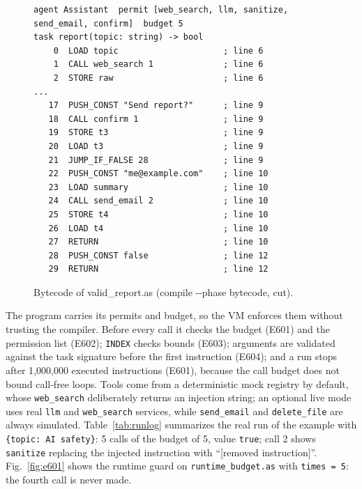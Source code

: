 \documentclass[conference]{IEEEtran}
\begin{document}
\begin{figure}[!htb]
\begin{lstlisting}
agent Assistant  permit [web_search, llm, sanitize, send_email, confirm]  budget 5
task report(topic: string) -> bool
    0  LOAD topic                     ; line 6
    1  CALL web_search 1              ; line 6
    2  STORE raw                      ; line 6
...
   17  PUSH_CONST "Send report?"      ; line 9
   18  CALL confirm 1                 ; line 9
   19  STORE t3                       ; line 9
   20  LOAD t3                        ; line 9
   21  JUMP_IF_FALSE 28               ; line 9
   22  PUSH_CONST "me@example.com"    ; line 10
   23  LOAD summary                   ; line 10
   24  CALL send_email 2              ; line 10
   25  STORE t4                       ; line 10
   26  LOAD t4                        ; line 10
   27  RETURN                         ; line 10
   28  PUSH_CONST false               ; line 12
   29  RETURN                         ; line 12
\end{lstlisting}
\caption{Bytecode of valid\_report.as (compile -{}-phase bytecode, cut).}
\label{fig:bytecode}
\end{figure}

The program carries its permits and budget, so the VM enforces them without trusting the compiler. Before every call it checks the budget (E601) and the permission list (E602); \texttt{INDEX} checks bounds (E603); arguments are validated against the task signature before the first instruction (E604); and a run stops after 1,000,000 executed instructions (E601), because the call budget does not bound call-free loops. Tools come from a deterministic mock registry by default, whose \texttt{web\_search} deliberately returns an injection string; an optional live mode uses real \texttt{llm} and \texttt{web\_search} services, while \texttt{send\_email} and \texttt{delete\_file} are always simulated. Table~\ref{tab:runlog} summarizes the real run of the example with \texttt{\{\textquotedbl{}topic\textquotedbl{}: \textquotedbl{}AI safety\textquotedbl{}\}}: 5 calls of the budget of 5, value \texttt{true}; call 2 shows \texttt{sanitize} replacing the injected instruction with ``[removed instruction]''. Fig.~\ref{fig:e601} shows the runtime guard on \texttt{runtime\_budget.as} with \texttt{times = 5}: the fourth call is never made.
\end{document}
